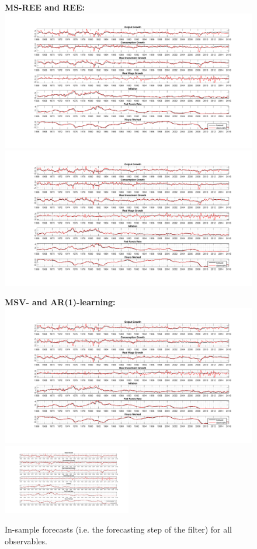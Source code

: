 \documentclass[12pt,reqno]{article}
\numberwithin{equation}{section}
\begin{document}
\begin{figure}[H]

\caption{In-sample forecasts (i.e. the forecasting step of the filter) for all observables.}
\label{sw_forecast_errors}
\vspace{5 mm}

\textbf{MS-REE and REE: }\\
\includegraphics[height=.5\textheight,width=.5\textwidth]{rise_forecast_errors.pdf}
\includegraphics[height=.5\textheight,width=.5\textwidth]{REE_forecast_errors.pdf}


\textbf{MSV- and AR(1)-learning: }\\
\includegraphics[height=.5\textheight,width=.5\textwidth]{sw_msv_forecast_errors.pdf}
\includegraphics[height=0.5\textheight,width=0.5\textwidth]{sw_ar1_forecast_errors.pdf}



\end{figure}


\end{document}

